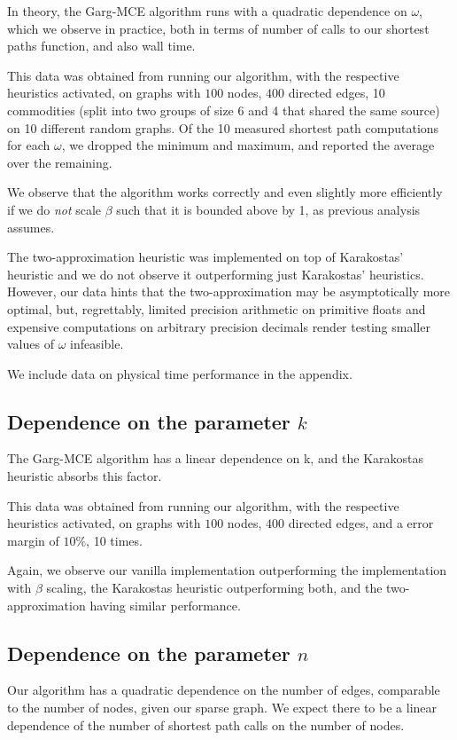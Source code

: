 In theory, the Garg-MCE algorithm runs with a quadratic dependence on $\omega$, which we observe in practice, both in
terms of number of calls to our shortest paths function, and also wall time.

This data was obtained from running our algorithm, with the respective heuristics activated, on graphs with $100$
nodes, $400$ directed edges, 10 commodities (split into two groups of
size 6 and 4 that shared the same source) on 10 different random
graphs. Of the 10 measured shortest path computations for each
$\omega$, we dropped the minimum and maximum, and reported the average over the remaining.

We observe that the algorithm works correctly and even slightly more efficiently if we do \emph{not} scale $\beta$ such
that it is bounded above by 1, as previous analysis assumes.

The two-approximation heuristic was implemented on top of Karakostas' heuristic and we do not observe it outperforming
just Karakostas' heuristics. However, our data hints that the two-approximation may be asymptotically more optimal,
but, regrettably, limited precision arithmetic on primitive floats and expensive computations on arbitrary precision
decimals render testing smaller values of $\omega$ infeasible.

We include data on physical time performance in the appendix.

\subsection{Dependence on the parameter $k$}

The Garg-MCE algorithm has a linear dependence on k, and the Karakostas heuristic absorbs this factor.

This data was obtained from running our algorithm, with the respective heuristics activated, on graphs with $100$
nodes, $400$ directed edges, and a error margin of $10\%$, 10 times.

Again, we observe our vanilla implementation outperforming the implementation with $\beta$ scaling, the Karakostas
heuristic outperforming both, and the two-approximation having similar performance.

\subsection{Dependence on the parameter $n$}

Our algorithm has a quadratic dependence on the number of edges, comparable to the number of nodes, given our sparse
graph.  We expect there to be a linear dependence of the number of shortest path calls on the number of nodes.

